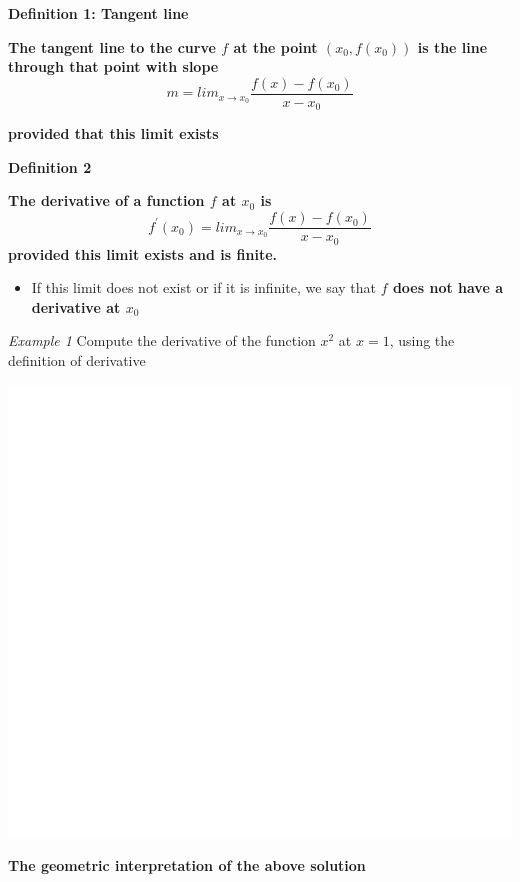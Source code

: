 \documentclass[]{book}
\providecommand{\tightlist}{%
  \setlength{\itemsep}{0pt}\setlength{\parskip}{0pt}}
\begin{document}
\textbf{Definition 1: Tangent line }

\textbf{The tangent line to the curve \(f\) at the point \((x_0, f(x_0))\) is the line through that point with slope} \[m = lim_{x\to x_{0}}\frac{f(x)-f(x_0)}{x-x_0}\]

\textbf{provided that this limit exists}

\textbf{Definition 2}

\textbf{The derivative of a function \(f\) at \(x_0\) is}
\[f^{\prime}(x_0) = lim_{x\to x_{0}}\frac{f(x) - f(x_0)}{x-x_0}\]
\textbf{provided this limit exists and is finite.}

\begin{itemize}
\tightlist
\item
  If this limit does not exist or if it is infinite, we say that \textbf{\(f\) does not have a derivative at \(x_{0}\)}
\end{itemize}

\newpage

\emph{Example 1}
Compute the derivative of the function \(x^2\) at \(x=1\), using the definition of derivative

\begin{center}\includegraphics[width=1\linewidth]{figure/Devbox1a-1} \end{center}

\newpage

\textbf{The geometric interpretation of the above solution}
\end{document}
